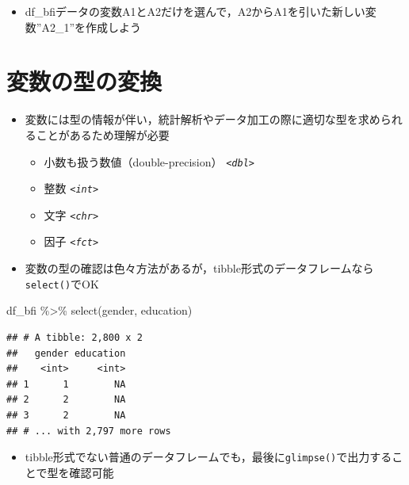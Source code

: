 \documentclass[
  xelatex,ja=standard, b5paper]{bxjsbook}
\newenvironment{Shaded}{\begin{snugshade}}{\end{snugshade}}
\newcommand{\FunctionTok}[1]{\textcolor[rgb]{0.00,0.00,0.00}{#1}}
\newcommand{\NormalTok}[1]{#1}
\newcommand{\SpecialCharTok}[1]{\textcolor[rgb]{0.00,0.00,0.00}{#1}}
\providecommand{\tightlist}{%
  \setlength{\itemsep}{0pt}\setlength{\parskip}{0pt}}
\begin{document}
\begin{itemize}
\tightlist
\item
  df\_bfiデータの変数A1とA2だけを選んで，A2からA1を引いた新しい変数''A2\_1''を作成しよう
\end{itemize}

\hypertarget{mu-kata}{%
\section{変数の型の変換}\label{mu-kata}}

\begin{itemize}
\tightlist
\item
  変数には型の情報が伴い，統計解析やデータ加工の際に適切な型を求められることがあるため理解が必要

  \begin{itemize}
  \tightlist
  \item
    小数も扱う数値（double-precision） \emph{\texttt{\textless{}dbl\textgreater{}}}
  \item
    整数 \emph{\texttt{\textless{}int\textgreater{}}}
  \item
    文字 \emph{\texttt{\textless{}chr\textgreater{}}}
  \item
    因子 \emph{\texttt{\textless{}fct\textgreater{}}}
  \end{itemize}
\item
  変数の型の確認は色々方法があるが，tibble形式のデータフレームなら\texttt{select()}でOK
\end{itemize}

\begin{Shaded}
\begin{Highlighting}[]
\NormalTok{df\_bfi }\SpecialCharTok{\%\textgreater{}\%} 
  \FunctionTok{select}\NormalTok{(gender, education)}
\end{Highlighting}
\end{Shaded}

\begin{verbatim}
## # A tibble: 2,800 x 2
##   gender education
##    <int>     <int>
## 1      1        NA
## 2      2        NA
## 3      2        NA
## # ... with 2,797 more rows
\end{verbatim}

\begin{itemize}
\tightlist
\item
  tibble形式でない普通のデータフレームでも，最後に\texttt{glimpse()}で出力することで型を確認可能
\end{itemize}
\end{document}
